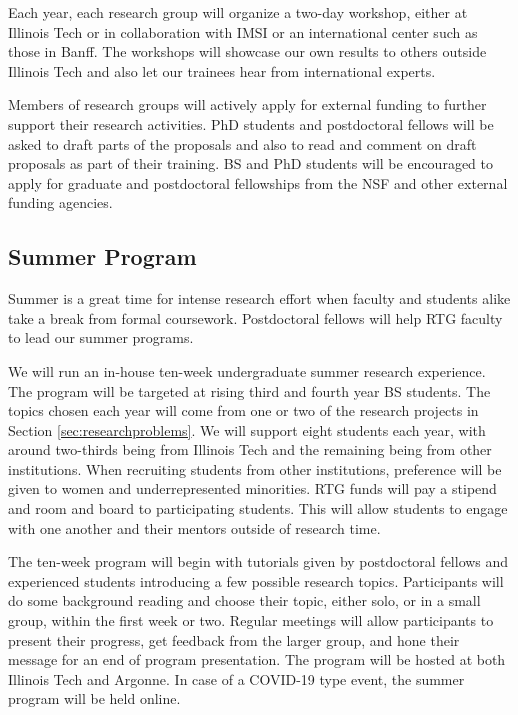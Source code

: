\documentclass[11pt]{NSFamsart}
\begin{document}
Each year, each research group will organize a two-day workshop, either at Illinois Tech or in collaboration with IMSI or an international center such as those in Banff.  The workshops will showcase our own results to others outside Illinois Tech and also let our trainees hear from international experts.

Members of research groups will actively apply for external funding to further support their research activities.  PhD students and postdoctoral fellows will be asked to draft parts of the proposals and also to read and comment on draft proposals as part of their training.  BS and PhD students will be encouraged to apply for graduate and postdoctoral fellowships from the NSF and other external funding agencies.



\subsection{Summer Program}    \label{sec:summer}

Summer is a great time for intense research effort when faculty and students alike take a break from formal coursework.  Postdoctoral fellows will help RTG faculty to lead our  summer programs.

We will run an in-house ten-week undergraduate summer research experience.  The program will be targeted at rising third and fourth year BS students.  The topics chosen each year will come from one or two of the research projects in Section \ref{sec:researchproblems}.  We will support eight students each year, with around two-thirds being from Illinois Tech and the remaining being from other institutions.  When recruiting students from other institutions, preference will be given to women and underrepresented minorities.  RTG funds
will pay a stipend and room and board to participating students.  This will allow students to engage with one another and their mentors outside of research time.  

The ten-week program will begin with tutorials given by postdoctoral fellows and experienced students introducing a few possible research topics.  Participants will do some background reading and choose their topic, either solo, or in a small group, within the first week or two.  Regular meetings will allow participants to present their progress, get feedback from the larger group, and hone their message for an end of program presentation. The program will be hosted at both Illinois Tech and Argonne.  In case of a COVID-19 type event, the summer program will be held online.
\end{document}
